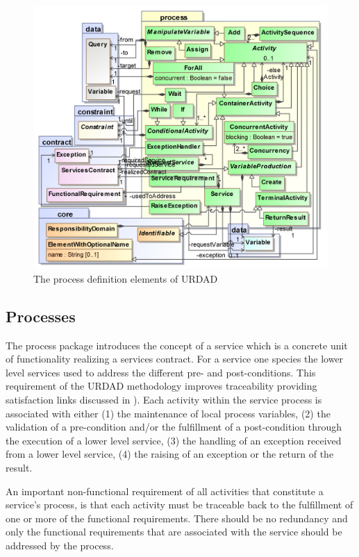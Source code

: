 \begin{figure}[Htbp]
  \centering
  \includegraphics{process}
  \caption{The process definition elements of URDAD}
  \label{fig:metamodel}
\end{figure}

\subsection{Processes}

The process package introduces the concept of a service which is a concrete unit of functionality realizing a services contract. For a service one species the lower level services used to address the different pre- and post-conditions. This requirement of the URDAD methodology improves traceability providing satisfaction links discussed in \cite{ramesh_toward_2001}). Each activity within the service process is associated with either (1) the maintenance of local process variables, (2) the validation of a pre-condition and/or the fulfillment of a post-condition through the execution of a lower level service, (3) the handling of an exception received from a lower level service, (4) the raising of an exception or the return of the result.

An important non-functional requirement of all activities that constitute a service's process, is that each activity must be traceable back to the fulfillment of one or more of the functional requirements. There should be no redundancy and only the functional requirements that are associated with the service should be addressed by the process.


